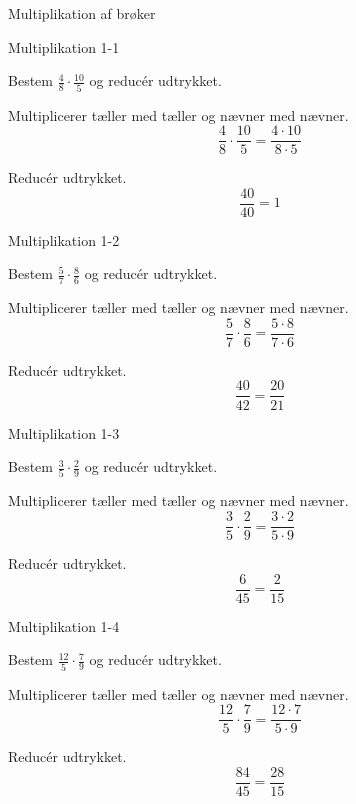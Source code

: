 \documentclass{article}
\begin{document}
Multiplikation af brøker

\tableofcontents
\newpage

\begin{exercise}{Multiplikation 1-1}

Bestem $\frac{4}{8} \cdot \frac{10}{5}$ og reducér udtrykket.


\hint

Multiplicerer tæller med tæller og nævner med nævner.
\[
\frac{4}{8} \cdot \frac{10}{5} = \frac{4 \cdot 10}{8 \cdot 5} 
\]

\hint

Reducér udtrykket.
\[
\frac{40}{40} = 1
\]


\end{exercise}

\newpage

\begin{exercise}{Multiplikation 1-2}
	
	Bestem $\frac{5}{7} \cdot \frac{8}{6}$ og reducér udtrykket.
	
	
	\hint
	
	Multiplicerer tæller med tæller og nævner med nævner.
	\[
	\frac{5}{7} \cdot \frac{8}{6} = \frac{5 \cdot  8}{7 \cdot 6}
	\]
	
	\hint
	
	Reducér udtrykket.
	\[
	\frac{40}{42} = \frac{20}{21}
	\]
	
	
\end{exercise}

\newpage

\begin{exercise}{Multiplikation 1-3}
	
	Bestem $\frac{3}{5} \cdot \frac{2}{9}$ og reducér udtrykket.
	
	
	\hint
	
	Multiplicerer tæller med tæller og nævner med nævner.
	\[
	\frac{3}{5} \cdot \frac{2}{9}= \frac{3 \cdot 2}{5 \cdot 9} 
	\]
	
	\hint
	
	Reducér udtrykket.
	\[
	\frac{6}{45} = \frac{2}{15}
	\]
	
	
\end{exercise}

\newpage

\begin{exercise}{Multiplikation 1-4}
	
	Bestem $\frac{12}{5} \cdot \frac{7}{9}$ og reducér udtrykket.
	
	
	\hint
	
	Multiplicerer tæller med tæller og nævner med nævner.
	\[
	\frac{12}{5} \cdot \frac{7}{9} = \frac{12 \cdot 7}{5 \cdot 9} 
	\]
	
	\hint
	
	Reducér udtrykket.
	\[
	\frac{84}{45} = \frac{28}{15}
	\]
	
	
\end{exercise}
\end{document}
